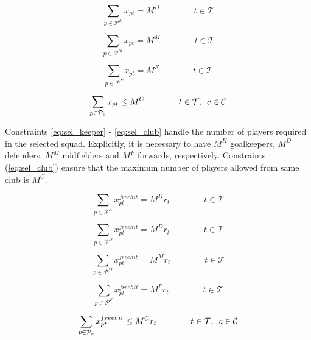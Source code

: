\begin{equation} \label{eq_sel_defender}
    \sum_{p \in \mathcal{P}^{D}} x_{pt} = M^{D} \qquad\qquad t \in \mathcal{T}
\end{equation}


\begin{equation} \label{eq:sel_midfielder}
    \sum_{p \in \mathcal{P}^{M}} x_{pt} = M^{M} \qquad\qquad t \in \mathcal{T}
\end{equation}

\begin{equation} \label{eq:sel_forward}
    \sum_{p \in \mathcal{P}^{F}} x_{pt} = M^{F} \qquad\qquad t \in \mathcal{T}
\end{equation}

\begin{equation} \label{eq:sel_club}
    \sum_{p \in \mathcal{P}_{c}} x_{pt} \leq M^{C} \qquad\qquad t \in \mathcal{T}, \enskip   c \in \mathcal{C}
\end{equation}

Constraints \eqref{eq:sel_keeper} - \eqref{eq:sel_club} handle the number of players required in the selected squad. Explicitly, it is necessary to have $M^{K}$ goalkeepers, $M^{D}$ defenders, $M^{M}$ midfielders and $M^{F}$ forwards, respectively. Constraints (\ref{eq:sel_club}) ensure that the maximum number of players allowed from same club is $M^{C}$. 

\begin{equation} \label{eq:free_hit_sel_keeper}
    \sum_{p \in \mathcal{P}^{K}} x_{pt}^{free hit} = M^{K}r_{t}  \qquad\qquad t \in \mathcal{T}
\end{equation}

\begin{equation} \label{eq:free_hit_sel_defender}
    \sum_{p \in \mathcal{P}^{D}} x_{pt}^{free hit} = M^{D}r_{t} \qquad\qquad t \in \mathcal{T}
\end{equation}

\begin{equation} \label{eq:free_hit_sel_midfielder}
    \sum_{p \in \mathcal{P}^{M}} x_{pt}^{free hit} = M^{M}r_{t} \qquad\qquad t \in \mathcal{T}
\end{equation}

\begin{equation} \label{eq:free_hit_sel_forward}
    \sum_{p \in \mathcal{P}^{F}} x_{pt}^{free hit} = M^{F}r_{t} \qquad\qquad t \in \mathcal{T}
\end{equation}

\begin{equation} \label{eq:free_hit_sel_club}
    \sum_{p \in \mathcal{P}_{c}} x_{pt}^{free hit} \leq M^{C}r_{t} \qquad\qquad t \in \mathcal{T}, \enskip   c \in \mathcal{C}
\end{equation}


